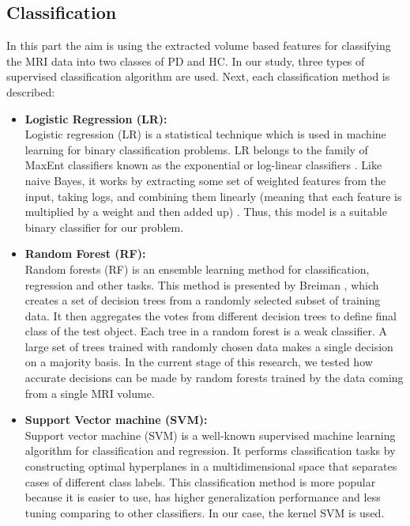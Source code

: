 \documentclass[runningheads,a4paper]{llncs}
\begin{document}
\subsection{Classification}
In this part the aim is using the extracted volume based features for classifying the MRI data into two classes of PD and HC. In our study, three types of supervised classification algorithm are used. Next, each classification method is described:
\begin{itemize}
\item \textbf{Logistic Regression (LR):}\\
Logistic regression (LR) is a statistical technique which is used in machine learning for binary classification problems. LR belongs to the family of MaxEnt classifiers known as the exponential or log-linear classifiers \cite{LR}. Like naive Bayes, it works by extracting some set of weighted features from the input, taking logs, and combining them linearly (meaning that each feature is multiplied by a weight and then added up) \cite{17}. Thus, this model is a suitable binary classifier for our problem.
\item \textbf{Random Forest (RF):}\\
Random forests (RF) is an ensemble learning method for classification, regression and other tasks. This method is presented by Breiman \cite{18}, which creates a set of decision trees from a randomly selected subset of training data. It then aggregates the votes from different decision trees to define final class of the test object. Each tree in a random forest is a weak classifier. A large set of trees trained with randomly chosen data makes a single decision on a majority basis. In the current stage of this research, we tested how accurate decisions can be made by random forests trained by the data coming from a single MRI volume.
\item \textbf{Support Vector machine (SVM):} \\
Support vector machine (SVM) \cite{19} is a well-known supervised machine learning algorithm for classification and regression. It performs classification tasks by constructing optimal hyperplanes in a multidimensional space that separates cases of different class labels. This classification method is more popular because it is easier to use, has higher generalization performance and less tuning comparing to other classifiers. In our case, the kernel SVM is used.

\end{itemize}
\end{document}
